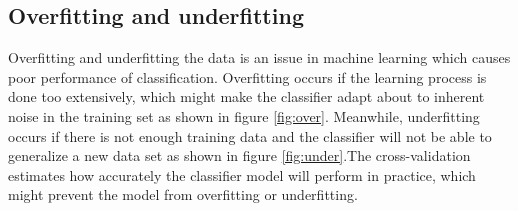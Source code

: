 \documentclass[USenglish]{ifimaster}  %
\begin{document}
\subsection{Overfitting and underfitting}
Overfitting and underfitting the data is an issue in machine learning which causes poor performance of classification. Overfitting occurs if the learning process is done too extensively, which might make the classifier adapt about to inherent noise in the training set as shown in figure \ref{fig:over}. Meanwhile, underfitting occurs if there is not enough training data and the classifier will not be able to generalize a new data set as shown in figure \ref{fig:under}.The cross-validation estimates how accurately the classifier model will perform in practice, which might prevent the model from overfitting or underfitting.
\end{document}
